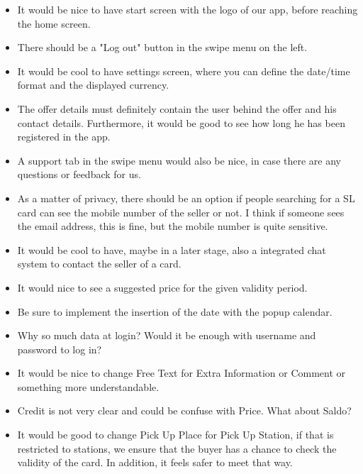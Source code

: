 \documentclass[11pt,twoside,a4paper]{report}
\begin{document}
\begin{itemize}

\item It would be nice to have start screen with the logo of our app, before reaching the home screen.

\item There should be a "Log out" button in the swipe menu on the left.

\item It would be cool to have settings screen, where you can define the date/time format and the displayed currency.

\item The offer details must definitely contain the user behind the offer and his contact details. Furthermore, it would be good to see how long he has been registered in the app.

\item A support tab in the swipe menu would also be nice, in case there are any questions or feedback for us.

\item As a matter of privacy, there should be an option if people searching for a SL card can see the mobile number of the seller or not. I think if someone sees the email address, this is fine, but the mobile number is quite sensitive.

\item It would be cool to have, maybe in a later stage, also a integrated chat system to contact the seller of a card.

\item It would nice to see a suggested price for the given validity period.

\item Be sure to implement the insertion of the date with the popup calendar.

\item Why so much data at login? Would it be enough with username and password to log in?

\item It would be nice to change Free Text for Extra Information or Comment or something more understandable.

\item Credit is not very clear and could be confuse with Price. What about Saldo?

\item It would be good to change Pick Up Place for Pick Up Station, if that is restricted to stations, we ensure that the buyer has a chance to check the validity of the card. In addition, it feels safer to meet that way.


\end{itemize}
\end{document}
